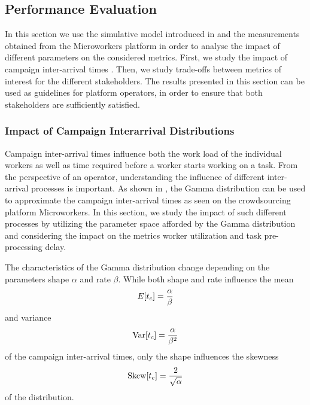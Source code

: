 \subsection{Performance Evaluation}\label{sec:cloud:crowdsourcing:performance_evaluation}

In this section we use the simulative model introduced in  and the measurements obtained from the Microworkers platform in order to analyse the impact of different parameters on the considered metrics.
First, we study the impact of campaign inter-arrival times .
Then, we study trade-offs between metrics of interest for the different stakeholders.
The results presented in this section can be used as guidelines for platform operators, in order to ensure that both stakeholders are sufficiently satisfied.

\subsubsection*{Impact of Campaign Interarrival Distributions}

Campaign inter-arrival times influence both the work load of the individual workers as well as time required before a worker starts working on a task.
From the perspective of an operator, understanding the influence of different inter-arrival processes is important.
As shown in , the Gamma distribution can be used to approximate the campaign inter-arrival times as seen on the crowdsourcing platform Microworkers.
In this section, we study the impact of such different processes by utilizing the parameter space afforded by the 
Gamma distribution and considering the impact on the metrics worker utilization and task pre-processing delay.

The characteristics of the Gamma distribution change depending on the parameters shape \(\alpha\) and rate \(\beta\).
While both shape and rate influence the mean 
\begin{equation*}
E[t_c] =  \frac{\alpha}{\beta}
\end{equation*}
and variance 
\begin{equation*}
\operatorname{Var}[t_c] =  \frac{\alpha}{\beta^2}
\end{equation*}
of the campaign inter-arrival times, only the shape influences the skewness 
\begin{equation*}
\operatorname{Skew}[t_c] =  \frac{2}{\sqrt{\alpha}}
\end{equation*}
of the distribution. 


